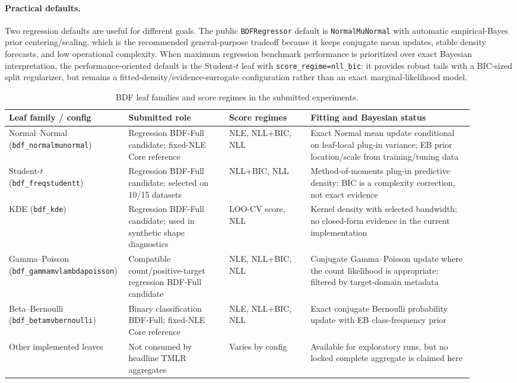 \paragraph{Practical defaults.}
Two regression defaults are useful for different goals. The public \texttt{BDFRegressor} default is \texttt{NormalMuNormal} with automatic empirical-Bayes prior centering/scaling, which is the recommended general-purpose tradeoff because it keeps conjugate mean updates, stable density forecasts, and low operational complexity. When maximum regression benchmark performance is prioritized over exact Bayesian interpretation, the performance-oriented default is the Student-$t$ leaf with \texttt{score\_regime=nll\_bic}: it provides robust tails with a BIC-sized split regularizer, but remains a fitted-density/evidence-surrogate configuration rather than an exact marginal-likelihood model.

\begin{landscape}
\begin{table}[!p]
\centering
\small
\caption{BDF leaf families and score regimes in the submitted experiments.}
\label{tab:bdf-leaf-regimes}
\begin{tabular}{p{0.19\linewidth}p{0.21\linewidth}p{0.17\linewidth}p{0.34\linewidth}}
\toprule
Leaf family / config & Submitted role & Score regimes & Fitting and Bayesian status \\
\midrule
Normal--Normal (\texttt{bdf\_normalmunormal}) & Regression BDF-Full candidate; fixed-NLE Core reference & NLE, NLL+BIC, NLL & Exact Normal mean update conditional on leaf-local plug-in variance; EB prior location/scale from training/tuning data \\
Student-$t$ (\texttt{bdf\_freqstudentt}) & Regression BDF-Full candidate; selected on 10/15 datasets & NLL+BIC, NLL & Method-of-moments plug-in predictive density; BIC is a complexity correction, not exact evidence \\
KDE (\texttt{bdf\_kde}) & Regression BDF-Full candidate; used in synthetic shape diagnostics & LOO-CV score, NLL & Kernel density with selected bandwidth; no closed-form evidence in the current implementation \\
Gamma--Poisson (\texttt{bdf\_gammamvlambdapoisson}) & Compatible count/positive-target regression BDF-Full candidate & NLE, NLL+BIC, NLL & Conjugate Gamma--Poisson update where the count likelihood is appropriate; filtered by target-domain metadata \\
Beta--Bernoulli (\texttt{bdf\_betamvbernoulli}) & Binary classification BDF-Full; fixed-NLE Core reference & NLE, NLL+BIC, NLL & Exact conjugate Bernoulli probability update with EB class-frequency prior \\
Other implemented leaves & Not consumed by headline TMLR aggregates & Varies by config & Available for exploratory runs, but no locked complete aggregate is claimed here \\
\bottomrule
\end{tabular}
\end{table}
\end{landscape}

